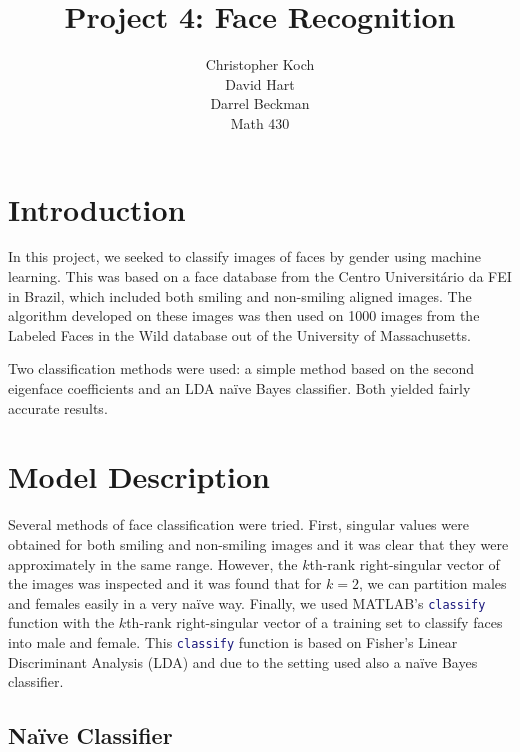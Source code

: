 \documentclass[hidelinks,11pt]{article}
\begin{document}
\title{Project 4: Face Recognition}
\author{Christopher Koch\\David Hart\\Darrel Beckman\\
Math 430}
\maketitle

\section{Introduction}
\label{sec:intro}

In this project, we seeked to classify images of faces by gender using machine
learning. This was based on a face database\cite{fei} from the Centro
Universitário da FEI in Brazil, which included both smiling and non-smiling
aligned images. The algorithm developed on these images was then used on 1000
images from the Labeled Faces in the Wild database out of the University of
Massachusetts\cite{lfw}. 

Two classification methods were used: a simple method based on the second
eigenface coefficients and an LDA na\"ive Bayes classifier. Both yielded
fairly accurate results.

\section{Model Description}
\label{sec:model}

Several methods of face classification were tried. First, singular values were
obtained for both smiling and non-smiling images and it was clear that they were
approximately in the same range. However, the $k$th-rank right-singular vector
of the images was inspected and it was found that for $k = 2$, we can partition
males and females easily in a very na\"ive way. Finally, we used MATLAB's
\lstinline[language=Matlab]{classify} function with the $k$th-rank
right-singular vector of a training set to classify faces into male and female.
This \lstinline[language=Matlab]{classify} function is based on Fisher's Linear
Discriminant Analysis (LDA) and due to the setting used also a na\"ive Bayes
classifier.

\subsection{Na\"ive Classifier}
\label{sec:model:naive}

\end{document}
